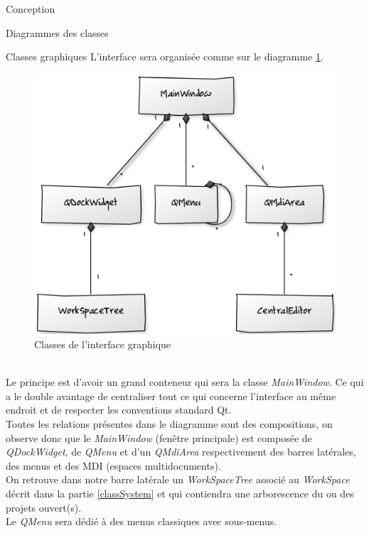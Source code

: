 \documentclass[a4paper, 12pt]{report}
\begin{document}
\begin{part}{Conception}
\begin{chapter}{Diagrammes des classes}
\begin{section}{Classes graphiques}
				L'interface sera organisée comme sur le diagramme \ref{chauffage}.

				\begin{figure}[ht]
					\begin{center}
						\includegraphics[width=12cm]{images/classesGraphiques.png}
						\caption{Classes de l'interface graphique}
						\label{chauffage}
					\end{center}
				\end{figure}~\\

				Le principe est d'avoir un grand conteneur qui sera la classe \emph{MainWindow}. Ce qui a le double avantage de centraliser
				tout ce qui concerne l'interface au même endroit et de respecter les conventions standard \gls{Qt}.\\


				Toutes les relations présentes dans le diagramme sont des compositions, on observe donc que le \emph{MainWindow}
				(fenêtre principale) est composée de \emph{QDockWidget}, de \emph{QMenu} et d'un \emph{QMdiArea} respectivement
				des barres latérales, des menus et des \gls{MDI} (espaces multidocuments).\\

				On retrouve dans notre barre latérale un \emph{WorkSpaceTree} associé au \emph{WorkSpace} décrit dans la partie \ref{classSystem}
				et qui contiendra une arborescence du ou des projets ouvert(s).\\

				Le \emph{QMenu} sera dédié à des menus classiques avec sous-menus.\\


\end{section}
\end{chapter}
\end{part}
\end{document}

